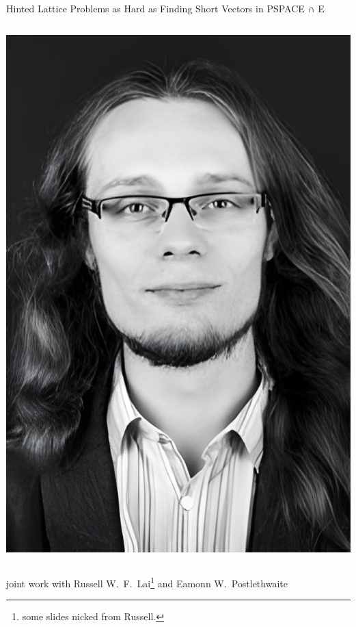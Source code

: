 \documentclass[xcolor=table,10pt,aspectratio=169]{beamer}
\begin{document}
\begin{frame}[label={sec:orgd509772}]{Hinted Lattice Problems as Hard as Finding Short Vectors in PSPACE ∩ E}
\begin{columns}
\begin{column}{0.5\columnwidth}
\begin{center}
\includegraphics[keepaspectratio,frame,height=0.6\textheight]{./eamonn.jpg}
\end{center}
\end{column}
\end{columns}

\begin{center}
joint work with Russell W. F. Lai\footnote{some slides nicked from Russell.} and Eamonn W. Postlethwaite
\end{center}
\end{frame}
\end{document}
